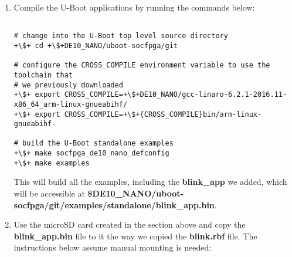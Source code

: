\begin{flushleft}
\begin{enumerate}[
	label=\textbf{Step \arabic*.},
	leftmargin=*,
	widest={00},
	align=left]
\begin{verbatim}

extra-y        := hello_world
|\hl{extra}\hl{\textminus}\hl{y}\hl{        +=}\hl{ blink\_app}|
extra-y        += de10_nano_hdmi_config

\end{verbatim}

You can do this by opening the Makefile in a text editor, or you can apply the update using \textbf{sed} like this:

\begin{verbatim}

|\$| sed -i.bak -e "/.*hello_world/a extra-y\ \ \ \ \ \ \ \ += blink_app" \
> |\$|DE10_NANO/uboot-socfpga/git/examples/standalone/Makefile

\end{verbatim}

\item Compile the U-Boot applications by running the commands below:

\begin{verbatim}

# change into the U-Boot top level source directory
+\$+ cd +\$+DE10_NANO/uboot-socfpga/git

# configure the CROSS_COMPILE environment variable to use the toolchain that
# we previously downloaded
+\$+ export CROSS_COMPILE=+\$+DE10_NANO/gcc-linaro-6.2.1-2016.11-x86_64_arm-linux-gnueabihf/
+\$+ export CROSS_COMPILE=+\$+{CROSS_COMPILE}bin/arm-linux-gnueabihf-

# build the U-Boot standalone examples
+\$+ make socfpga_de10_nano_defconfig
+\$+ make examples

\end{verbatim}

This will build all the examples, including the \textbf{blink\_app} we added, which will be accessible at \textbf{\$DE10\_NANO/\allowbreak uboot-socfpga/\allowbreak git/\allowbreak examples/\allowbreak standalone/\allowbreak blink\_app.bin}.

\item Use the microSD card created in the  section above and copy the \textbf{blink\_app.bin} file to it the way we copied the \textbf{blink.rbf} file.  The instructions below assume manual mounting is needed:


\end{enumerate}
\end{flushleft}
